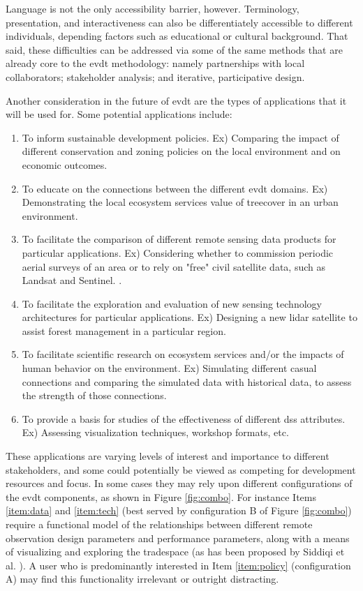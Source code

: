 Language is not the only accessibility barrier, however. Terminology, presentation, and interactiveness can also be differentiately accessible to different individuals, depending factors such as educational or cultural background. That said, these difficulties can be addressed via some of the same methods that are already core to the \ac{evdt} methodology: namely partnerships with local collaborators; stakeholder analysis; and iterative, participative design. 

Another consideration in the future of \ac{evdt} are the types of applications that it will be used for. Some potential applications include:

\begin{enumerate} \setlength{\itemsep}{0pt} \setlength{\parskip}{0pt}
    \item To inform sustainable development policies. Ex) Comparing the impact of different conservation and zoning policies on the local environment and on economic outcomes.  \label{item:policy}
    \item To educate on the connections between the different \ac{evdt} domains. Ex) Demonstrating the local ecosystem services value of treecover in an urban environment.
	\item To facilitate the comparison of different remote sensing data products for particular applications. Ex) Considering whether to commission periodic aerial surveys of an area or to rely on "free" civil satellite data, such as Landsat and Sentinel. \label{item:data}.
    \item To facilitate the exploration and evaluation of new sensing technology architectures for particular applications. Ex) Designing a new \ac{lidar} satellite to assist forest management in a particular region. \label{item:tech}
    \item To facilitate scientific research on ecosystem services and/or the impacts of human behavior on the environment. Ex) Simulating different casual connections and comparing the simulated data with historical data, to assess the strength of those connections.
    \item To provide a basis for studies of the effectiveness of different \ac{dss} attributes. Ex) Assessing visualization techniques, workshop formats, etc. \label{item:user}
\end{enumerate}

These applications are varying levels of interest and importance to different stakeholders, and some could potentially be viewed as competing for development resources and focus. In some cases they may rely upon different configurations of the \ac{evdt} components, as shown in Figure \ref{fig:combo}. For instance Items \ref{item:data} and \ref{item:tech} (best served by configuration B of Figure \ref{fig:combo}) require a functional model of the relationships between different remote observation design parameters and performance parameters, along with a means of visualizing and exploring the tradespace (as has been proposed by Siddiqi et al. \cite{siddiqiValuingNewEarth2019}). A user who is predominantly interested in Item \ref{item:policy} (configuration A) may find this functionality irrelevant or outright distracting.

